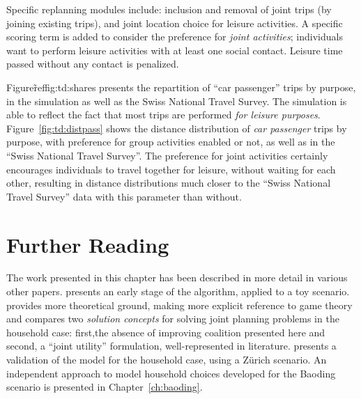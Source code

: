 {Specific replanning modules include: inclusion and removal of joint trips (by joining existing trips), and joint location choice for leisure activities. A specific scoring term is added to consider the preference for \emph{joint activities}; individuals want to perform leisure activities with at least one social contact. Leisure time passed without any contact is penalized.

Figure\~ref{fig:td:shares} presents the repartition of ``car passenger'' trips by purpose, in the simulation as well as the Swiss National Travel Survey. The simulation is able to reflect the fact that most trips are performed \emph{for leisure purposes}.
%
%
Figure~\ref{fig:td:distpass} shows the distance distribution of \emph{car passenger} trips by purpose, with preference for group activities enabled or not, as well as in the ``Swiss National Travel Survey''. The preference for joint activities certainly encourages individuals to travel together for leisure, without waiting for each other, resulting in distance distributions much closer to the
``Swiss National Travel Survey'' data with this parameter than without.


\section{Further Reading}
The work presented in this chapter has been described in more detail in various other papers. \citet{DubernetAxhausen_TransLett_2013} presents an early stage of the algorithm, applied to a toy scenario. \citet{DubernetAxhausen_STRC_2014} provides more theoretical ground, making more explicit reference to game theory and compares two \emph{solution concepts} for solving  joint planning problems in the household case: first,the absence of improving coalition presented here and second, a ``joint utility'' formulation, well-represented in literature. \citet{DubernetAxhausen_Transportation_forth} presents a validation of the model for the household case, using a Zürich scenario. An independent approach to model household choices developed for the Baoding scenario is presented in Chapter~\ref{ch:baoding}.

} %
